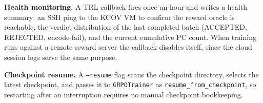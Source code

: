 \textbf{Health monitoring.}
A TRL callback fires once an hour and writes a health summary: an SSH ping to the
KCOV VM to confirm the reward oracle is reachable, the verdict distribution of the
last completed batch (ACCEPTED, REJECTED, encode-fail), and the current cumulative
PC count.
When training runs against a remote reward server the callback disables itself,
since the cloud session logs serve the same purpose.

\textbf{Checkpoint resume.}
A \texttt{--resume} flag scans the checkpoint directory, selects the latest
checkpoint, and passes it to \texttt{GRPOTrainer} as
\texttt{resume\_from\_checkpoint}, so restarting after an interruption requires no
manual checkpoint bookkeeping.
